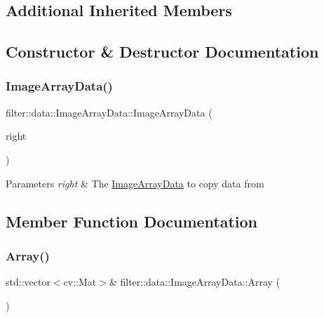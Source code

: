 \subsection*{Additional Inherited Members}


\subsection{Constructor \& Destructor Documentation}
\mbox{\label{classfilter_1_1data_1_1_image_array_data_aaaf37db86b4659ac8cb10e5f44a2869b}} 
\subsubsection{\texorpdfstring{Image\+Array\+Data()}{ImageArrayData()}}
{\footnotesize\ttfamily filter\+::data\+::\+Image\+Array\+Data\+::\+Image\+Array\+Data (\begin{DoxyParamCaption}\item[{const \hyperlink{classfilter_1_1data_1_1_image_array_data}{data\+::\+Image\+Array\+Data} \&}]{right }\end{DoxyParamCaption})\hspace{0.3cm}{\ttfamily [inline]}}


\begin{DoxyParams}{Parameters}
{\em right} & The \hyperlink{classfilter_1_1data_1_1_image_array_data}{Image\+Array\+Data} to copy data from \\
\hline
\end{DoxyParams}


\subsection{Member Function Documentation}
\mbox{\label{classfilter_1_1data_1_1_image_array_data_acded510f22f9c549adea6174e44dae2a}} 
\subsubsection{\texorpdfstring{Array()}{Array()}}
{\footnotesize\ttfamily std\+::vector$<$cv\+::\+Mat$>$\& filter\+::data\+::\+Image\+Array\+Data\+::\+Array (\begin{DoxyParamCaption}{ }\end{DoxyParamCaption})\hspace{0.3cm}{\ttfamily [inline]}}


